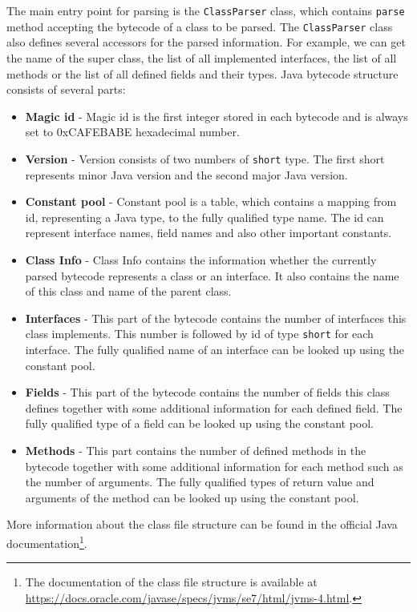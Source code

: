 The main entry point for parsing is the \texttt{ClassParser} class, which contains \texttt{parse} method accepting the bytecode of a class to be parsed. The \texttt{ClassParser} class also defines several accessors for the parsed information. For example, we can get the name of the super class, the list of all implemented interfaces, the list of all methods or the list of all defined fields and their types. Java bytecode structure consists of several parts:
\begin{itemize}
	\item \textbf{Magic id} - Magic id is the first integer stored in each bytecode and is always set to 0xCAFEBABE hexadecimal number.
	\item \textbf{Version} - Version consists of two numbers of \texttt{short} type. The first short represents minor Java version and the second major Java version.
	\item \textbf{Constant pool} - Constant pool is a table, which contains a mapping from id, representing a Java type, to the fully qualified type name. The id can represent interface names, field names and also other important constants.
	\item \textbf{Class Info} - Class Info contains the information whether the currently parsed bytecode represents a class or an interface. It also contains the name of this class and name of the parent class.
	\item \textbf{Interfaces} - This part of the bytecode contains the number of interfaces this class implements. This number is followed by id of type \texttt{short} for each interface. The fully qualified name of an interface can be looked up using the constant pool.
	\item \textbf{Fields} - This part of the bytecode contains the number of fields this class defines together with some additional information for each defined field. The fully qualified type of a field can be looked up using the constant pool.
	\item \textbf{Methods} - This part contains the number of defined methods in the bytecode together with some additional information for each method such as the number of arguments. The fully qualified types of return value and arguments of the method can be looked up using the constant pool.
\end{itemize}
More information about the class file structure can be found in the official Java documentation\footnote{The documentation of the class file structure is available at \url{https://docs.oracle.com/javase/specs/jvms/se7/html/jvms-4.html}.}.
